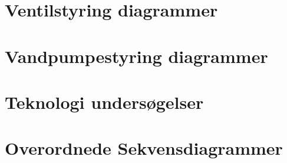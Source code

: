 \newpage
\section{Ventilstyring diagrammer}


\newpage
\section{Vandpumpestyring diagrammer}


\newpage
\section{Teknologi undersøgelser}


\newpage
\section{Overordnede Sekvensdiagrammer}
